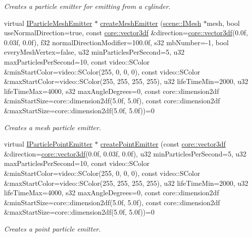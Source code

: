 \begin{DoxyCompactItemize}
\begin{DoxyCompactList}\small\item\em Creates a particle emitter for emitting from a cylinder. \end{DoxyCompactList}\item 
virtual \hyperlink{classirr_1_1scene_1_1IParticleMeshEmitter}{I\+Particle\+Mesh\+Emitter} $\ast$ \hyperlink{classirr_1_1scene_1_1IParticleSystemSceneNode_a7e08b7e74a5295fd167769d5ee5a5161}{create\+Mesh\+Emitter} (\hyperlink{classirr_1_1scene_1_1IMesh}{scene\+::\+I\+Mesh} $\ast$mesh, bool use\+Normal\+Direction=true, const \hyperlink{namespaceirr_1_1core_a06f169d08b5c429f5575acb7edbad811}{core\+::vector3df} \&direction=\hyperlink{namespaceirr_1_1core_a06f169d08b5c429f5575acb7edbad811}{core\+::vector3df}(0.\+0f, 0.\+03f, 0.\+0f), f32 normal\+Direction\+Modifier=100.\+0f, s32 mb\+Number=-\/1, bool every\+Mesh\+Vertex=false, u32 min\+Particles\+Per\+Second=5, u32 max\+Particles\+Per\+Second=10, const video\+::\+S\+Color \&min\+Start\+Color=video\+::\+S\+Color(255, 0, 0, 0), const video\+::\+S\+Color \&max\+Start\+Color=video\+::\+S\+Color(255, 255, 255, 255), u32 life\+Time\+Min=2000, u32 life\+Time\+Max=4000, s32 max\+Angle\+Degrees=0, const core\+::dimension2df \&min\+Start\+Size=core\+::dimension2df(5.\+0f, 5.\+0f), const core\+::dimension2df \&max\+Start\+Size=core\+::dimension2df(5.\+0f, 5.\+0f))=0
\begin{DoxyCompactList}\small\item\em Creates a mesh particle emitter. \end{DoxyCompactList}\item 
virtual \hyperlink{classirr_1_1scene_1_1IParticleEmitter}{I\+Particle\+Point\+Emitter} $\ast$ \hyperlink{classirr_1_1scene_1_1IParticleSystemSceneNode_a99e2549ad185f0c23b73f43869c60ab8}{create\+Point\+Emitter} (const \hyperlink{namespaceirr_1_1core_a06f169d08b5c429f5575acb7edbad811}{core\+::vector3df} \&direction=\hyperlink{namespaceirr_1_1core_a06f169d08b5c429f5575acb7edbad811}{core\+::vector3df}(0.\+0f, 0.\+03f, 0.\+0f), u32 min\+Particles\+Per\+Second=5, u32 max\+Particles\+Per\+Second=10, const video\+::\+S\+Color \&min\+Start\+Color=video\+::\+S\+Color(255, 0, 0, 0), const video\+::\+S\+Color \&max\+Start\+Color=video\+::\+S\+Color(255, 255, 255, 255), u32 life\+Time\+Min=2000, u32 life\+Time\+Max=4000, s32 max\+Angle\+Degrees=0, const core\+::dimension2df \&min\+Start\+Size=core\+::dimension2df(5.\+0f, 5.\+0f), const core\+::dimension2df \&max\+Start\+Size=core\+::dimension2df(5.\+0f, 5.\+0f))=0
\begin{DoxyCompactList}\small\item\em Creates a point particle emitter. \end{DoxyCompactList}\item 

\end{DoxyCompactItemize}
